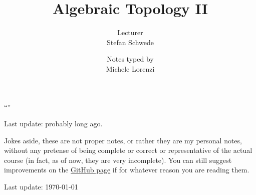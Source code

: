 \documentclass[a4paper, 10pt, oneside, DIV=9, chapterprefix=true, numbers=enddot,bibliography=totoc]{scrbook}
\title{Algebraic Topology II}
\author{{\normalsize Lecturer}\\
	Stefan Schwede}
\date{{\normalsize Notes typed by}\\
	Michele Lorenzi}
\begin{document}
\frontmatter
{}
\renewcommand{\thedummy}{\arabic{dummy}}
\maketitle

{\setlength{\parindent}{0pt}
\enquote{}


\hrulefill

Last update: probably long ago.}

{\newpage
\setlength{\parindent}{0pt}
Jokes aside, these are not proper notes, or rather they are my personal notes, without any pretense of being complete or correct or representative of the actual course (in fact, as of now, they are very incomplete). You can still suggest improvements on the \href{https://www.youtube.com/watch?v=dQw4w9WgXcQ}{GitHub page} if for whatever reason you are reading them.


\hrulefill

Last update: \today}

\tableofcontents
{}
\setcounter{llecture}{0}
\mainmatter{}
\renewcommand{\thedummy}{\thechapter.\arabic{dummy}}
\renewcommand{\thechapter}{\arabic{chapter}}




















\nocite{*}


\backmatter{}
\printbibliography[heading=bibintoc, title={References}]
\end{document}

